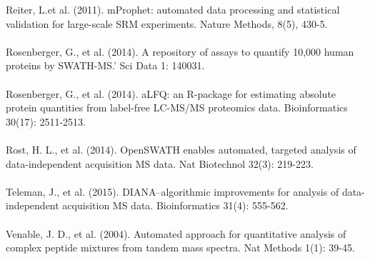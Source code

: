 \documentclass[a4paper]{article}
\begin{document}
Reiter, L.et al. (2011). mProphet: automated data processing and statistical validation for large-scale SRM experiments. Nature Methods, 8(5), 430-5.\\
\\
Rosenberger, G., et al. (2014). A repository of assays to quantify 10,000 human proteins by SWATH-MS.' Sci Data 1: 140031.\\
 \\
Rosenberger, G., et al. (2014). aLFQ: an R-package for estimating absolute protein quantities from label-free LC-MS/MS proteomics data. Bioinformatics 30(17): 2511-2513.\\
 \\
Rost, H. L., et al. (2014). OpenSWATH enables automated, targeted analysis of data-independent acquisition MS data. Nat Biotechnol 32(3): 219-223.\\
 \\
Teleman, J., et al. (2015). DIANA--algorithmic improvements for analysis of data-independent acquisition MS data. Bioinformatics 31(4): 555-562.\\
 \\
Venable, J. D., et al. (2004). Automated approach for quantitative analysis of complex peptide mixtures from tandem mass spectra. Nat Methods 1(1): 39-45.\\
\\
\\
\end{document}
